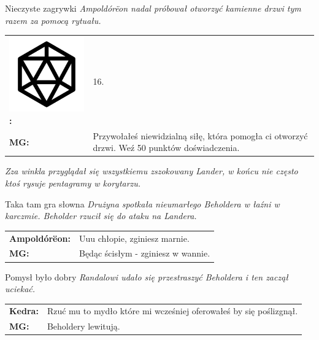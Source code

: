 \documentclass[10pt,twoside,twocolumn]{book}
\begin{document}
\begin{rpg-quotebox}{Nieczyste zagrywki}
   \textit{Ampoldórëon nadal próbował otworzyć kamienne drzwi tym razem za pomocą rytuału.}\\

   \begin{tabularx}{\columnwidth}{lX}
      \includegraphics[scale=0.055]{img/d20.png}\textbf{:}& 16.\\
      \textbf{MG:} & Przywołałeś niewidzialną siłę, która pomogła ci otworzyć drzwi. Weź 50 punktów doświadczenia.\\
   \end{tabularx}

   \textit{Zza winkla przyglądał się wszystkiemu zszokowany Lander, w końcu nie często ktoś rysuje pentagramy w korytarzu.}\\
\end{rpg-quotebox}


\begin{rpg-quotebox}{Taka tam gra słowna}
   \textit{Drużyna spotkała nieumarłego Beholdera w łaźni w karczmie. Beholder rzucił się do ataku na Landera.}\\

   \begin{tabularx}{\columnwidth}{lX}
      \textbf{Ampoldórëon:} & Uuu chłopie, zginiesz marnie.\\
      \textbf{MG:} & Będąc ścisłym - zginiesz w wannie.\\
   \end{tabularx}
\end{rpg-quotebox}


\begin{rpg-quotebox}{Pomysł było dobry}
   \textit{Randalowi udało się przestraszyć Beholdera i ten zaczął uciekać.}\\

   \begin{tabularx}{\columnwidth}{lX}
      \textbf{Kedra:} & Rzuć mu to mydło które mi wcześniej oferowałeś by się poślizgnął.\\
      \textbf{MG:} & Beholdery lewitują.\\
   \end{tabularx}
\end{rpg-quotebox}
\end{document}
